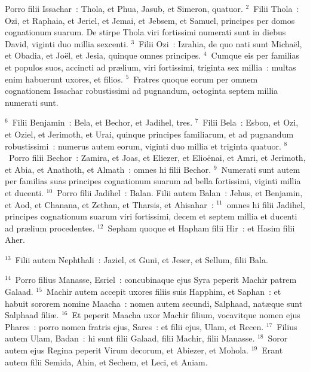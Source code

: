 \bchapter
\lettrine[lines=3,image=true,loversize=0.05,lraise=-0.03]{P}{}orro filii Issachar~: Thola, et Phua, Jasub, et Simeron, quatuor.
${}^{2}$~Filii Thola~: Ozi, et Raphaia, et Jeriel, et Jemai, et Jebsem, et Samuel, principes per domos cognationum suarum. De stirpe Thola viri fortissimi numerati sunt in diebus David, viginti duo millia sexcenti.
${}^{3}$~Filii Ozi~: Izrahia, de quo nati sunt Micha\"el, et Obadia, et Jo\"el, et Jesia, quinque omnes principes.
${}^{4}$~Cumque eis per familias et populos suos, accincti ad pr\ae lium, viri fortissimi, triginta sex millia~: multas enim habuerunt uxores, et filios.
${}^{5}$~Fratres quoque eorum per omnem cognationem Issachar robustissimi ad pugnandum, octoginta septem millia numerati sunt.


${}^{6}$~Filii Benjamin~: Bela, et Bechor, et Jadihel, tres.
${}^{7}$~Filii Bela~: Esbon, et Ozi, et Oziel, et Jerimoth, et Urai, quinque principes familiarum, et ad pugnandum robustissimi~: numerus autem eorum, viginti duo millia et triginta quatuor.
${}^{8}$~Porro filii Bechor~: Zamira, et Joas, et Eliezer, et Elio\"enai, et Amri, et Jerimoth, et Abia, et Anathoth, et Almath~: omnes hi filii Bechor.
${}^{9}$~Numerati sunt autem per familias suas principes cognationum suarum ad bella fortissimi, viginti millia et ducenti.
${}^{10}$~Porro filii Jadihel~: Balan. Filii autem Balan~: Jehus, et Benjamin, et Aod, et Chanana, et Zethan, et Tharsis, et Ahisahar~:
${}^{11}$~omnes hi filii Jadihel, principes cognationum suarum viri fortissimi, decem et septem millia et ducenti ad pr\ae lium procedentes.
${}^{12}$~Sepham quoque et Hapham filii Hir~: et Hasim filii Aher.


${}^{13}$~Filii autem Nephthali~: Jaziel, et Guni, et Jeser, et Sellum, filii Bala.


${}^{14}$~Porro filius Manasse, Esriel~: concubinaque ejus Syra peperit Machir patrem Galaad.
${}^{15}$~Machir autem accepit uxores filiis suis Happhim, et Saphan~: et habuit sororem nomine Maacha~: nomen autem secundi, Salphaad, nat\ae que sunt Salphaad fili\ae .
${}^{16}$~Et peperit Maacha uxor Machir filium, vocavitque nomen ejus Phares~: porro nomen fratris ejus, Sares~: et filii ejus, Ulam, et Recen.
${}^{17}$~Filius autem Ulam, Badan~: hi sunt filii Galaad, filii Machir, filii Manasse.
${}^{18}$~Soror autem ejus Regina peperit Virum decorum, et Abiezer, et Mohola.
${}^{19}$~Erant autem filii Semida, Ahin, et Sechem, et Leci, et Aniam.


